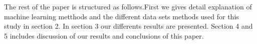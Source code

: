 The rest of the paper is structured as follows.First we gives detail explanation of machine learning metthods and the different data sets methods used for this study in section 2. In section 3 our  differents results are presented. Section 4 and 5 includes discussion of our results and conclusions of this paper.
 
 